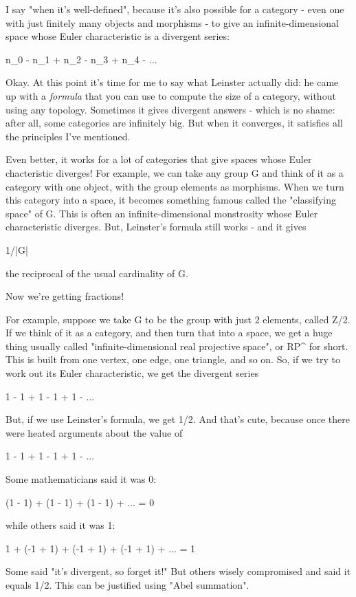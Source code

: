 I say "when it's well-defined", because it's also possible
for a category - even one with just finitely many objects and
morphisms - to give an infinite-dimensional space whose Euler
characteristic is a divergent series:

n_{0} - n_{1} + n_{2} - n_{3} +
n_{4} - ...

Okay.  At this point it's time for me to say what Leinster actually
did: he came up with a \emph{formula} that you can use to compute
the size of a category, without using any topology.  Sometimes it
gives divergent answers - which is no shame: after all, some
categories are infinitely big.  But when it converges, it satisfies
all the principles I've mentioned.

Even better, it works for a lot of categories that give spaces whose
Euler chacteristic diverges!  For example, we can take any group G and
think of it as a category with one object, with the group elements as
morphisms.  When we turn this category into a space, it becomes
something famous called the "classifying space" of G.  This
is often an infinite-dimensional monstrosity whose Euler
characteristic diverges.  But, Leinster's formula still works - and it
gives

1/|G|

the reciprocal of the usual cardinality of G.  

Now we're getting fractions!  

For example, suppose we take G to be the group with just 2 elements,
called Z/2.  If we think of it as a category, and then turn that into
a space, we get a huge thing usually called "infinite-dimensional
real projective space", or RP^{\infty } for short.  This
is built from one vertex, one edge, one triangle, and so on.  So, if
we try to work out its Euler characteristic, we get the divergent
series

1 - 1 + 1 - 1 + 1 - ...

But, if we use Leinster's formula, we get 1/2.  And that's cute, because 
once there were heated arguments about the value of 

1 - 1 + 1 - 1 + 1 - ...

Some mathematicians said it was 0:

(1 - 1) + (1 - 1) + (1 - 1) + ... = 0

while others said it was 1:

1 + (-1 + 1) + (-1 + 1) + (-1 + 1) + ... = 1

Some said "it's divergent, so forget it!" But others wisely
compromised and said it equals 1/2.  This can be justified using
"Abel summation".

